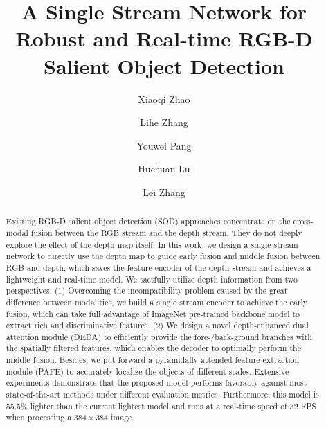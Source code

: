 \documentclass[runningheads]{llncs}
\begin{document}
\pagestyle{headings}
\mainmatter
\def\ECCVSubNumber{4160}  

\title{A Single Stream Network for Robust and Real-time RGB-D Salient Object Detection} 


\begin{comment}
\titlerunning{ECCV-20 submission ID \ECCVSubNumber} 
\authorrunning{ECCV-20 submission ID \ECCVSubNumber} 
\author{Anonymous ECCV submission}
\institute{Paper ID \ECCVSubNumber}
\end{comment}


\author{Xiaoqi Zhao \and
Lihe Zhang\protect\footnotemark[1]\and
Youwei Pang\and Huchuan Lu\and Lei Zhang}
\maketitle
\renewcommand{\thefootnote}{\fnsymbol{footnote}}  \renewcommand{\thefootnote}{\arabic{footnote}}
\begin{abstract}
Existing RGB-D salient object detection (SOD) approaches concentrate on the cross-modal fusion between the RGB stream and the depth stream. They do not deeply explore the effect of the depth map itself. In this work, we design a single stream network to directly use the depth map to guide early fusion and middle fusion between RGB and depth, which saves the feature encoder of the depth stream and achieves a lightweight and real-time model.        
We tactfully utilize depth information from two perspectives: (1) Overcoming the incompatibility problem caused by the great difference between modalities, we build a single stream encoder to achieve the early fusion, which can take full advantage of ImageNet pre-trained backbone model to extract rich and discriminative features. 
(2) We design a novel depth-enhanced dual attention module (DEDA) to efficiently provide the fore-/back-ground branches with the spatially filtered features, which enables the decoder to optimally perform the middle fusion. Besides, we put forward a pyramidally attended feature extraction module (PAFE) to accurately localize the objects of different scales. Extensive experiments demonstrate that the proposed model performs favorably against most state-of-the-art methods under different evaluation metrics. Furthermore, this model is 55.5\% lighter than the current lightest model and runs at a real-time speed of 32 FPS when processing a $384 \times 384$ image. 
\end{abstract}
\end{document}
